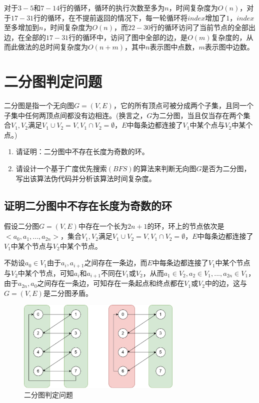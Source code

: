 \documentclass{article}
\begin{document}
对于$3-5$和$7-14$行的循环，循环的执行次数至多为$n$，时间复杂度为$O(n)$，对于$17-31$行的循环，在不提前返回的情况下，每一轮循环将$index$增加了$1$，$index$至多增加到$n$，时间复杂度为$O(n)$，而$22-30$行的循环访问了当前节点的全部出边，在全部的$17-31$行的循环中，访问了图中全部的边，是$O(m)$复杂度的，从而此做法的总时间复杂度为$O(n+m)$，其中$n$表示图中点数，$m$表示图中边数。

\section{二分图判定问题}

二分图是指一个无向图$G=(V,E)$，它的所有顶点可被分成两个子集，且同一个子集中任何两顶点间都没有边相连。(换言之，$G$为二分图，当且仅当存在两个集合$V_1,V_2$满足$V_1\cup{V_2}=V,V_1\cap{V_2}=\emptyset$，$E$中每条边都连接了$V_1$中某个点与$V_2$中某个点。)

\begin{enumerate}[itemindent=3em]
    \item{请证明：二分图中不存在长度为奇数的环。}
    \item{请设计一个基于广度优先搜索$(BFS)$的算法来判断无向图$G$是否为二分图，写出该算法伪代码并分析该算法时间复杂度。}
\end{enumerate}

\subsection{证明二分图中不存在长度为奇数的环}

假设二分图$G=(V,E)$中存在一个长为$2n+1$的环，环上的节点依次是$<a_0,a_1,...,a_{2n}>$，集合$V_1,V_2$满足$V_1\cup{V_2}=V,V_1\cap{V_2}=\emptyset$，$E$中每条边都连接了$V_1$中某个节点与$V_2$中某个节点。

不妨设$a_0\in{V_1}$由于$a_i,a_{i+1}$之间存在一条边，而$E$中每条边都连接了$V_1$中某个节点与$V_2$中某个节点，可知$a_i$和$a_{i+1}$不同在$V_1$或$V_2$，从而$a_1\in{V_2},a_2\in{V_1},...,a_{2n}\in{V_1}$，由于$a_{2n},a_0$之间存在一条边，可知存在一条起点和终点都在$V_1$或$V_2$中的边，这与$G=(V,E)$是二分图矛盾。

\begin{figure}[H]
\centering
\includegraphics[width=0.7\textwidth]{algorithm_pic6.jpg}
\caption{二分图判定问题}
\label{二分图判定问题}
\end{figure}
\end{document}
